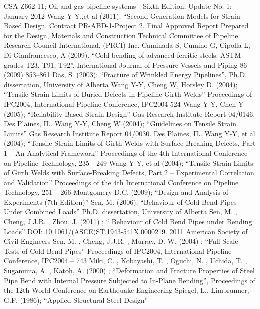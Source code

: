\begin{thebibliography}{9}
CSA Z662-11; Oil and gas pipeline systems - Sixth Edition; Update No. 1: January 2012
Wang Y-Y.,et al (2011); “Second Generation Models for Strain-Based Design. Contract PR-ABD-1-Project 2. Final Approved Report Prepared for the Design, Materials and Construction Technical Committee of Pipeline Research Council International, (PRCI) Inc.
Caminada S, Cumino G, Cipolla L, Di Gianfrancesco, A (2009). “Cold bending of advanced ferritic steels: ASTM grades T23, T91, T92”. International Journal of Pressure Vessels and Piping 86 (2009) 853–861
Das, S. (2003): ``Fracture of Wrinkled Energy Pipelines'', Ph.D. dissertation, University of Alberta 
Wang Y-Y, Cheng W, Horsley D. (2004); “Tensile Strain Limits of Buried Defects in Pipeline Girth Welds” Proceedings of IPC2004, International Pipeline Conference, IPC2004-524
Wang Y-Y, Chen Y (2005); “Reliability Based Strain Design” Gas Research Institute Report 04/0146. Des Plaines, IL.
Wang Y-Y, Cheng W (2004); “Guidelines on Tensile Strain Limits” Gas Research Institute Report 04/0030. Des Plaines, IL.
Wang Y-Y, et al (2004); “Tensile Strain Limits of Girth Welds with Surface-Breaking Defects, Part 1 – An Analytical Framework” Proceedings of the 4th International Conference on Pipeline Technology, 235—249
Wang Y-Y, et al (2004); “Tensile Strain Limits of Girth Welds with Surface-Breaking Defects, Part 2 – Experimental Correlation and Validation” Proceedings of the 4th International Conference on Pipeline Technology, 251 – 266
Montgomery D.C. (2009); “Design and Analysis of Experiments (7th Edition)”
Sen, M. (2006); “Behaviour of Cold Bend Pipes Under Combined Loads” Ph.D. dissertation, University of Alberta
Sen, M. , Cheng, J.J.R. , Zhou, J. (2011) ; “ Behaviour of Cold Bend Pipes under Bending Loads” 
DOI: 10.1061/(ASCE)ST.1943-541X.0000219. 2011 American Society of Civil Engineers
Sen, M. , Cheng, J.J.R. , Murray, D. W. (2004) ; “Full-Scale Tests of Cold Bend Pipes” Proceedings of IPC2004, International Pipeline Conference, IPC2004 – 743
Miki, C. , Kobayashi, T. , Oguchi, N. , Uchida, T. , Suganuma, A. , Katoh, A. (2000) ; “Deformation and Fracture Properties of Steel Pipe Bend with Internal Pressure Subjected to In-Plane Bending”, Proceedings of the 12th World Conference on Earthquake Engineering
Spiegel, L., Limbrunner, G.F. (1986); “Applied Structural Steel Design” 
\end{thebibliography}